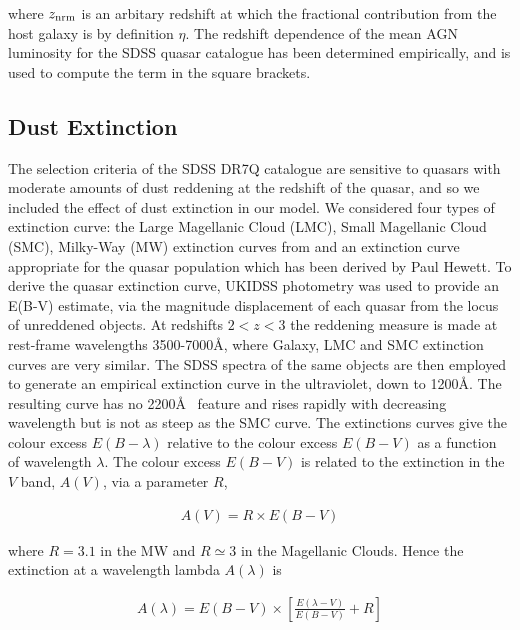 where $z_{\rm nrm}$ is an arbitary redshift at which the fractional contribution from the host galaxy is by definition $\eta$. 
The redshift dependence of the mean \ac{AGN} luminosity for the SDSS quasar catalogue has been determined empirically, and is used to compute the term in the square brackets. 

\subsection{Dust Extinction}
\label{sec:sed-extinction} 

The selection criteria of the SDSS DR7Q catalogue are sensitive to quasars with moderate amounts of dust reddening \citep[possibly as high as E(B-V) $\sim$ 0.5;][]{richards03} at the redshift of the quasar, and so we included the effect of dust extinction in our model. 
We considered four types of extinction curve: the Large Magellanic Cloud (LMC), Small Magellanic Cloud (SMC), Milky-Way (MW) extinction curves from \citet{pei92} and an extinction curve appropriate for the quasar population which has been derived by Paul Hewett. 
To derive the quasar extinction curve, UKIDSS photometry was used to provide an E(B-V) estimate, via the magnitude displacement of each quasar from the locus of unreddened objects. 
At redshifts $2 < z < 3$ the reddening measure is made at rest-frame wavelengths 3500-7000\AA, where Galaxy, LMC and SMC extinction curves are very similar. 
The SDSS spectra of the same objects are then employed to generate an empirical extinction curve in the ultraviolet, down to 1200\AA. 
The resulting curve has no 2200\AA~ feature and rises rapidly with decreasing wavelength but is not as steep as the SMC curve. 
The extinctions curves give the colour excess $E(B-\lambda)$ relative to the colour excess $E(B-V)$ as a function of wavelength $\lambda$. 
The colour excess $E(B-V)$ is related to the extinction in the $V$ band, $A(V)$, via a parameter $R$, 

\begin{eqnarray}
  A(V) = R \times E(B -V )
\end{eqnarray}

where $R = 3.1$ in the MW and $R \simeq 3$ in the Magellanic Clouds. 
Hence the extinction at a wavelength lambda $A(\lambda)$ is 

\begin{eqnarray}
  A(\lambda) = E(B-V) \times \left[ \frac{E(\lambda-V)}{E(B-V)} + R \right] 
\end{eqnarray}

